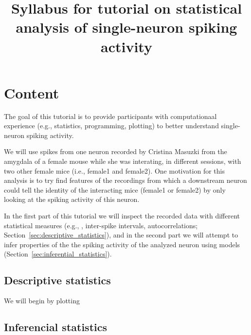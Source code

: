 \documentclass[10pt]{article}
\title{Syllabus for tutorial on statistical analysis of single-neuron spiking activity}
\author{}
\begin{document}
\section{Content}

The goal of this tutorial is to provide participants with computationaal
experience (e.g., statistics, programming, plotting) to better understand
single-neuron spiking activity.

We will use spikes from one neuron recorded by Cristina Masuzki from the amygdala of a
female mouse while she was interating, in different sessions, with two other
female mice (i.e., female1 and female2). One motivation for this analysis is to
try find features of the recordings from which a downstream neuron could tell
the identity of the interacting mice (female1 or female2) by only looking at
the spiking activity of this neuron.

In the first part of this tutorial we will inspect the recorded data with
different statistical measures (e.g., , inter-spike intervals,
autocorrelations; Section~\ref{sec:descriptive_statistics}), and in the second
part we will attempt to infer properties of the the spiking activity of the
analyzed neuron using models (Section~\ref{sec:inferential_statistics}).

\subsection{Descriptive statistics}

We will begin by plotting 

\subsection{Inferencial statistics}
\end{document}
